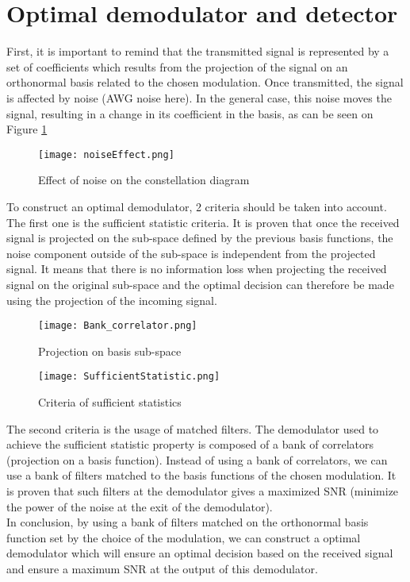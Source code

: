 \section{Optimal demodulator and detector}

First, it is important to remind that the transmitted signal is represented by a set of coefficients which results from the projection of the signal on an orthonormal basis related to the chosen modulation. Once transmitted, the signal is affected by noise (AWG noise here). In the general case, this noise moves the signal, resulting in a change in its coefficient in the basis, as can be seen on Figure \ref{fig:noise_effect}\\

\begin{figure}[H]
    \centering
    \texttt{[image: noiseEffect.png]}
    \caption{Effect of noise on the constellation diagram}
    \label{fig:noise_effect}
\end{figure}

To construct an optimal demodulator, 2 criteria should be taken into account.  The first one is the sufficient statistic criteria.  It is proven that once the received signal
is projected on the sub-space defined by the previous basis functions, the noise component outside of the sub-space is independent from the projected signal.
It means that there is no information loss when projecting the received signal on the original sub-space and the optimal decision can therefore be made using the projection of the incoming signal.

\begin{figure}[H]
    \centering
    \texttt{[image: Bank\_correlator.png]}
    \caption{Projection on basis sub-space}
    \label{fig:Bank_correlator}
\end{figure}

\begin{figure}[H]
    \centering
    \texttt{[image: SufficientStatistic.png]}
    \caption{Criteria of sufficient statistics}
    \label{fig:Sufficientstatistic}
\end{figure}

The second criteria is the usage of matched filters. The demodulator used to achieve the sufficient statistic property is composed of a bank of correlators (projection on a basis function).
Instead of using a bank of correlators, we can use a bank of filters matched to the basis functions of the chosen modulation. It is proven that such filters at the demodulator gives
 a maximized SNR (minimize the power of the noise at the exit of the demodulator).\\
In conclusion, by using a bank of filters matched on the orthonormal basis function set by the choice of the modulation, we can construct a optimal demodulator which
will ensure an optimal decision based on the received signal and ensure a maximum SNR at the output of this demodulator.


